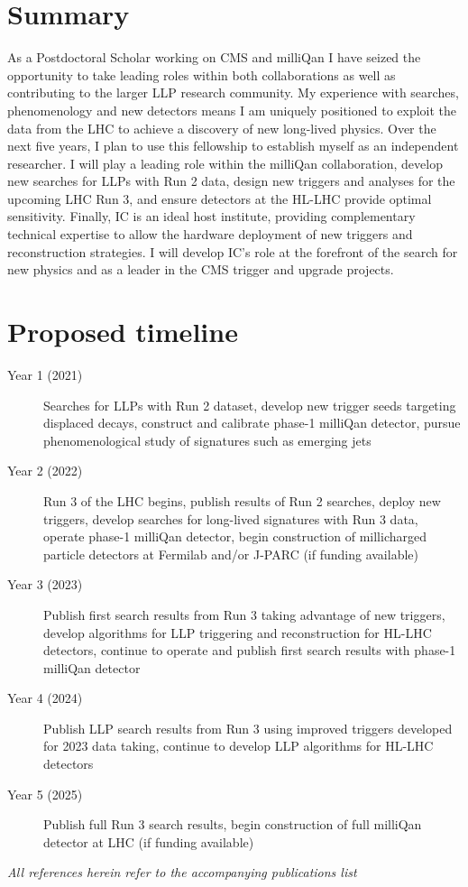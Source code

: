 \documentclass[11pt,a4paper]{article}
\theoremstyle{plain} \numberwithin{equation}{section}
\theoremstyle{definition}
\newcounter{list}
\begin{document}
\section*{Summary}

As a Postdoctoral Scholar working on CMS and milliQan
I have seized the opportunity to take leading roles within both collaborations
as well as contributing to the larger LLP research community.
My experience with searches, phenomenology and 
new detectors means I am uniquely positioned to exploit the data
from the LHC to achieve a discovery of new long-lived physics.
Over the next five years, I plan to use this fellowship to establish
myself as an independent researcher. I will play a leading role 
within the milliQan collaboration, develop new searches for LLPs with Run 2 data, 
design new triggers and analyses for the upcoming LHC Run 3, and ensure detectors at the HL-LHC
provide optimal sensitivity. Finally, IC is an ideal host institute, providing
complementary technical expertise to allow the hardware deployment of new triggers and
reconstruction strategies. I will develop IC's role at the forefront
of the search for new physics and as a leader in the CMS trigger and
upgrade projects.


\section*{Proposed timeline}
\begin{description}
\item[Year 1 (2021)]{Searches for LLPs with Run 2 dataset, develop new trigger seeds
targeting displaced decays, construct and calibrate phase-1 milliQan detector, pursue phenomenological study of signatures such as emerging jets}
\item[Year 2 (2022)]{Run 3 of the LHC begins, publish results of Run 2 searches, deploy new triggers, develop searches for long-lived signatures with Run 3 data, operate phase-1 milliQan detector, begin construction of millicharged particle detectors at Fermilab and/or J-PARC (if funding available)}
\item[Year 3 (2023)]{Publish first search results from Run 3 taking advantage of new triggers, develop algorithms for LLP triggering and reconstruction for HL-LHC detectors, continue to operate and publish first search results with phase-1 milliQan detector}
\item[Year 4 (2024)]{Publish LLP search results from Run 3 using improved triggers developed for 2023 data taking, continue to develop LLP algorithms for HL-LHC detectors}
\item[Year 5 (2025)]{Publish full Run 3 search results, begin construction of full milliQan detector at LHC (if funding available)}
\end{description}
\it{All references herein refer to the accompanying publications list}
\newpage
\AtBeginShipout{%
\AtBeginShipoutDiscard
}

\end{document}
